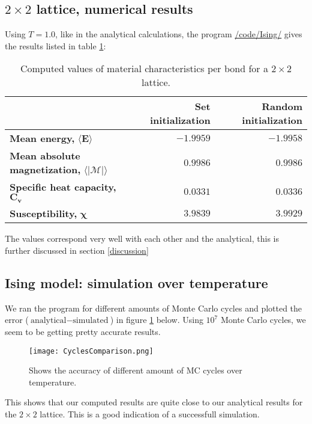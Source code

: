 \documentclass[../main.tex]{subfiles}
\begin{document}
\subsection{$2 \times 2$ lattice, numerical results}
Using $T = 1.0$, like in the analytical calculations, the program \href{https://github.com/kmaasrud/Project-4/tree/master/code/Ising}{/code/Ising/} gives the results listed in table \ref{tab:2x2computed}:
\begin{table}[!h]
  \begin{center}
    \begin{tabular}{| l | r | r |}
      \hline
       & \textbf{Set initialization} & \textbf{Random initialization} \\
      \hline
      \textbf{Mean energy,} $\mathbf{\langle E \rangle}$ & $-1.9959$ & $-1.9958$\\
      \hline
      \textbf{Mean absolute magnetization,} $\mathbf{\langle |\mathcal{M}| \rangle}$ & $0.9986$ & $0.9986$ \\
      \hline
      \textbf{Specific heat capacity,} $\mathbf{C_v}$ & $ 0.0331$ & $0.0336$ \\
      \hline
      \textbf{Susceptibility,} $\mathbf \chi$ & $3.9839$ & $3.9929$ \\
      \hline
    \end{tabular}
    \caption{Computed values of material characteristics per bond for a $2\times 2$ lattice.}
    \label{tab:2x2computed}
  \end{center}
\end{table}
\FloatBarrier
The values correspond very well with each other and the analytical, this is further discussed in section \ref{discussion}

\subsection{Ising model: simulation over temperature} \label{sec:res-compareanalytical}
We ran the program for different amounts of Monte Carlo cycles and plotted the error ($\text{analytical} - \text{simulated}$) in figure \ref{fig:results-MCplot} below. Using $10^7$ Monte Carlo cycles, we seem to be getting pretty accurate results.

\begin{figure}[!h]
  \texttt{[image: CyclesComparison.png]}
  \caption{Shows the accuracy of different amount of MC cycles over temperature.}
  \label{fig:results-MCplot}
\end{figure}
\FloatBarrier
This shows that our computed results are quite close to our analytical results for the $2\times 2$ lattice. This is a good indication of a successfull simulation.
\end{document}
